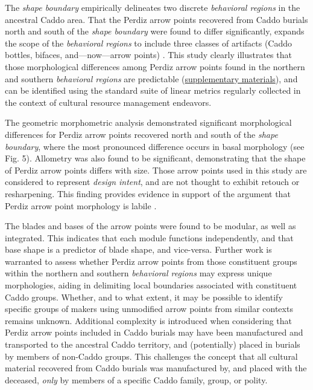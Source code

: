 \documentclass[smallextended]{svjour3}       %
\begin{document}
The \emph{shape boundary} empirically delineates two discrete
\emph{behavioral regions} in the ancestral Caddo area. That the Perdiz
arrow points recovered from Caddo burials north and south of the
\emph{shape boundary} were found to differ significantly, expands the
scope of the \emph{behavioral regions} to include three classes of
artifacts (Caddo bottles, bifaces, and---now---arrow points)
\cite{RN8074,RN7927,RN8370,RN8312,RN8322,RN8158}. This study clearly
illustrates that those morphological differences among Perdiz arrow
points found in the northern and southern \emph{behavioral regions} are
predictable (\href{https://seldenlab.github.io/perdiz3/}{supplementary
materials}), and can be identified using the standard suite of linear
metrics regularly collected in the context of cultural resource
management endeavors.

The geometric morphometric analysis demonstrated significant
morphological differences for Perdiz arrow points recovered north and
south of the \emph{shape boundary}, where the most pronounced difference
occurs in basal morphology (see Fig. 5). Allometry was also found to be
significant, demonstrating that the shape of Perdiz arrow points differs
with size. Those arrow points used in this study are considered to
represent \emph{design intent}, and are not thought to exhibit retouch
or resharpening. This finding provides evidence in support of the
argument that Perdiz arrow point morphology is labile \cite{RN9364}.

The blades and bases of the arrow points were found to be modular, as
well as integrated. This indicates that each module functions
independently, and that base shape is a predictor of blade shape, and
vice-versa. Further work is warranted to assess whether Perdiz arrow
points from those constituent groups within the northern and southern
\emph{behavioral regions} may express unique morphologies, aiding in
delimiting local boundaries associated with constituent Caddo groups.
Whether, and to what extent, it may be possible to identify specific
groups of makers using unmodified arrow points from similar contexts
remains unknown. Additional complexity is introduced when considering
that Perdiz arrow points included in Caddo burials may have been
manufactured and transported to the ancestral Caddo territory, and
(potentially) placed in burials by members of non-Caddo groups. This
challenges the concept that all cultural material recovered from Caddo
burials was manufactured by, and placed with the deceased, \emph{only}
by members of a specific Caddo family, group, or polity.
\end{document}
